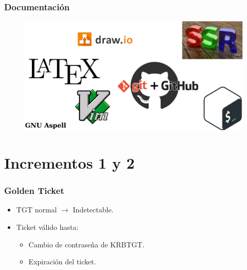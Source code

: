 \documentclass[a4paper,10pt]{beamer}
\begin{document}
\begin{frame}[fragile]
	\frametitle{Documentación}

	\begin{figure}[H]
		\centering
		\includegraphics[width=\textwidth]{figuras/TH_documentacion.png}
	\end{figure}
\end{frame}


\section{Incrementos 1 y 2}
\begin{frame}[fragile]
	\frametitle{Golden Ticket}

	\begin{itemize}
		\item TGT normal $\xrightarrow{}$ Indetectable. %
		\item Ticket válido hasta:
		\begin{itemize}
			\item Cambio de contraseña de KRBTGT. %
			\item Expiración del ticket.
		\end{itemize}
	\end{itemize}
\end{frame}
\end{document}
